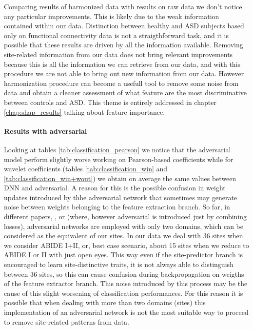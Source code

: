 \documentclass[11pt]{report}
\begin{document}
\hfill

Comparing results of harmonized data with results on raw data we don't notice any particular improvements. This is likely due to the weak information contained within our data. Distinction between healthy and ASD subjects based only on functional connectivity data is not a straigthforward task, and it is possible that these results are driven by all the information available. Removing site-related information from our data does not bring relevant improvements because this is all the information we can retrieve from our data, and with this procedure we are not able to bring out new information from our data.
However harmonization procedure can become a usefull tool to remove some noise from data and obtain a cleaner assessment of what feature are the most discriminative between controls and ASD. This theme is entirely addressed in chapter \ref{chap:shap_results} talking about feature importance.


\paragraph{Results with adversarial}
Looking at tables \ref{tab:classification_pearson} we notice that the adversarial model perform slightly worse working on Pearson-based coefficients while for wavelet coefficients (tables \ref{tab:classification_win} and \ref{tab:classification_win+wout}) we obtain on average the same values between DNN and adversarial.
A reason for this is the possible confusion in weight updates introduced by thhe adversarial network that sometimes may generate noise between weights belonging to the feature extraction branch. So far, in different papers, \cite{ganin2016}, \cite{kamath2019} or \cite{guan2021} (where, however adversarial is introduced just by combining losses), adversarial networks are employed with only two domains, which can be considered as the equivalent of our sites. In our data we deal with 36 sites when we consider ABIDE I+II, or, best case scenario, about 15 sites when we reduce to ABIDE I or II with just open eyes.
This way even if the site-predictor branch is encouraged to learn site-distinctive traits, it is not always able to distinguish between 36 sites, so this can cause confusion during backpropagation on weigths of the feature extractor branch. This noise introduced by this process may be the cause of this slight worsening of classification performances.
For this reason it is possible that when dealing with more than two domains (sites) this implementation of an adversarial network is not the most suitable way to proceed to remove site-related patterns from data.
\end{document}
